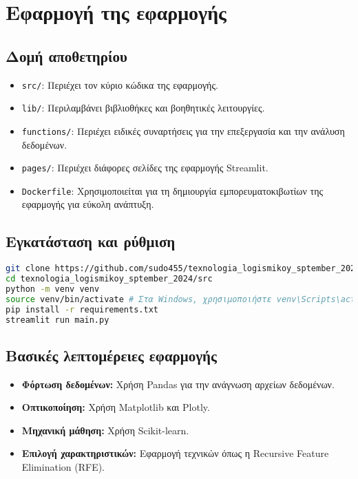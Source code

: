 \documentclass{article}
\begin{document}
\section{Εφαρμογή της εφαρμογής}

\subsection{Δομή αποθετηρίου}
\begin{itemize}
    \item \texttt{src/}: Περιέχει τον κύριο κώδικα της εφαρμογής.
    \item \texttt{lib/}: Περιλαμβάνει βιβλιοθήκες και βοηθητικές λειτουργίες.
    \item \texttt{functions/}: Περιέχει ειδικές συναρτήσεις για την επεξεργασία και την ανάλυση δεδομένων.
    \item \texttt{pages/}: Περιέχει διάφορες σελίδες της εφαρμογής Streamlit.
    \item \texttt{Dockerfile}: Χρησιμοποιείται για τη δημιουργία εμπορευματοκιβωτίων της εφαρμογής για εύκολη ανάπτυξη.
\end{itemize}

\subsection{Εγκατάσταση και ρύθμιση}
\begin{lstlisting}[language=bash]
git clone https://github.com/sudo455/texnologia_logismikoy_sptember_2024.git
cd texnologia_logismikoy_sptember_2024/src
python -m venv venv
source venv/bin/activate # Στα Windows, χρησιμοποιήστε venv\Scripts\activate
pip install -r requirements.txt
streamlit run main.py
\end{lstlisting}

\subsection{Βασικές λεπτομέρειες εφαρμογής}
\begin{itemize}
    \item \textbf{Φόρτωση δεδομένων:} Χρήση Pandas για την ανάγνωση αρχείων δεδομένων.
    \item \textbf{Οπτικοποίηση:} Χρήση Matplotlib και Plotly.
    \item \textbf{Μηχανική μάθηση:} Χρήση Scikit-learn.
    \item \textbf{Επιλογή χαρακτηριστικών:} Εφαρμογή τεχνικών όπως η Recursive Feature Elimination (RFE).
\end{itemize}
\end{document}
